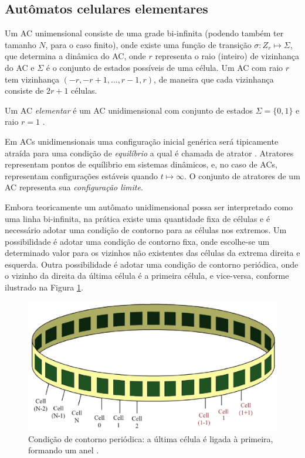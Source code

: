 \documentclass[12pt,a4paper]{article}
\begin{document}
\subsection{Autômatos celulares elementares}

Um AC unimensional consiste de uma grade bi-infinita (podendo também ter tamanho
$N$, para o caso finito), onde existe uma função de transição $\sigma: Z_r \mapsto \Sigma$,
que determina a dinâmica do AC, onde $r$ representa o raio (inteiro) de vizinhança do AC e
$\Sigma$ é o conjunto de estados possíveis de uma célula. Um AC com raio $r$ tem 
vizinhança $(-r,-r+1,\ldots,r-1,r)$, de maneira que cada vizinhança consiste
de $2r+1$ células.

Um AC \textit{elementar} é um AC unidimensional com conjunto de estados
$\Sigma = \{0,1\}$ e raio $r=1$ .

Em ACs unidimensionais uma configuração inicial genérica será tipicamente atraída
para uma condição de \textit{equilíbrio} a qual é chamada de atrator .
Atratores representam pontos de equílibrio em sistemas dinâmicos, e, no caso de ACs,
representam configurações estáveis quando $t \mapsto \infty$. O conjunto de atratores
de um AC representa sua \textit{configuração limite}.

Embora teoricamente um autômato unidimensional possa ser interpretado como uma linha bi-infinita,
na prática existe uma quantidade fixa de células e é necessário adotar uma condição de contorno
para as células nos extremos. Um possibilidade é adotar uma condição de contorno fixa, onde
escolhe-se um determinado valor para os vizinhos não existentes das células da extrema direita
e esquerda. Outra possibilidade é adotar uma condição de contorno periódica, onde o vizinho
da direita da última célula é a primeira célula, e vice-versa, conforme ilustrado na Figura
\ref{fig:ring}.

\begin{figure}[htp]
\begin{center}
\includegraphics[scale=0.3]{img/ring.eps}
\caption{Condição de contorno periódica: a última célula é ligada à primeira,
formando um anel .}
\label{fig:ring}
\end{center}
\end{figure}
\end{document}
